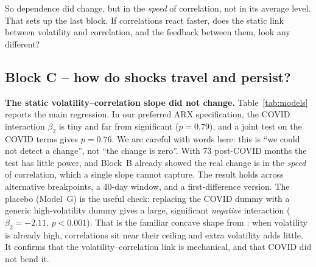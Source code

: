 \documentclass[11pt,a4paper]{article}
\begin{document}
So dependence did change, but in the \emph{speed} of correlation, not in its average level. That sets up
the last block. If correlations react faster, does the static link between volatility and correlation,
and the feedback between them, look any different?

\subsection{Block C -- how do shocks travel and persist?}

\textbf{The static volatility--correlation slope did not change.} Table~\ref{tab:models} reports the main
regression. In our preferred ARX specification, the COVID interaction $\beta_2$ is tiny and far from
significant ($p=0.79$), and a joint test on the COVID terms gives $p=0.76$. We are careful with words
here: this is ``we could not detect a change'', not ``the change is zero''. With 73 post-COVID months the
test has little power, and Block~B already showed the real change is in the \emph{speed} of correlation,
which a single slope cannot capture. The result holds across alternative breakpoints, a 40-day window, and
a first-difference version. The placebo (Model~G) is the useful check: replacing the COVID dummy with a
generic high-volatility dummy gives a large, significant \emph{negative} interaction ($\beta_2=-2.11$,
$p<0.001$). That is the familiar concave shape from \citet{longin2001}: when volatility is already high,
correlations sit near their ceiling and extra volatility adds little. It confirms that the
volatility--correlation link is mechanical, and that COVID did not bend it.
\end{document}
